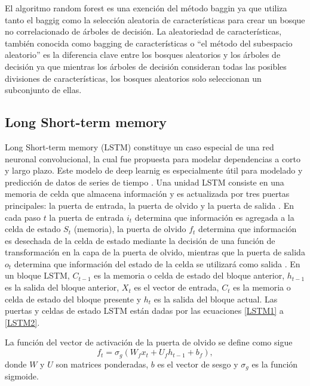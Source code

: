 El algoritmo random forest es una exención del método baggin ya que utiliza tanto el baggig como la selección aleatoria de características para crear un bosque no correlacionado de árboles de decisión.
La aleatoriedad de características, también conocida como bagging de características o ``el método del subespacio aleatorio'' es la diferencia clave entre los bosques aleatorios y los árboles de decisión ya que mientras los árboles de decisión consideran todas las posibles divisiones de características, los bosques aleatorios solo seleccionan un subconjunto de ellas.


\subsection{Long Short-term memory}

Long Short-term memory (LSTM) constituye un caso especial de una red neuronal convolucional, la cual fue propuesta para modelar dependencias a corto y largo plazo. Este modelo de deep learnig es especialmente útil para modelado y predicción de datos de series de tiempo \parencite{mudassirTimeseriesForecastingBitcoin2020}.
Una unidad LSTM consiste en una memoria de celda que almacena información y es actualizada por tres puertas principales: la puerta de entrada, la puerta de olvido y la puerta de salida \parencite{chenBitcoinPricePrediction2020}.
En cada paso $t$ la puerta de entrada $i_t$ determina que información es agregada a la celda de estado $S_t$ (memoria), la puerta de olvido $f_t$ determina que información es desechada de la celda de estado mediante la decisión de una función de transformación en la capa de la puerta de olvido, mientras que la puerta de salida $o_t$ determina que información del estado de la celda se utilizará como salida \parencite{livierisEnsembleDeepLearning2020}.
En un bloque LSTM, $C_{t-1}$ es la memoria o celda de estado del bloque anterior, $h_{t-1}$ es la salida del bloque anterior, $X_t$ es el vector de entrada, $C_t$  es la memoria o celda de estado del bloque presente y  $h_{t}$ es la salida del bloque actual.
Las puertas y celdas de estado LSTM están dadas por las ecuaciones \ref{LSTM1} a \ref{LSTM2}.

La función del vector de activación de la puerta de olvido se define como sigue
\begin{equation}
	f_{t}=\sigma_{g}\left(W_{f} x_{t}+U_{f} h_{t-1}+b_{f}\right),
	\label{LSTM1}
\end{equation}
donde $W$ y $U$ son matrices ponderadas, $b$ es el vector de sesgo y $\sigma_{g}$ es la función sigmoide. 

